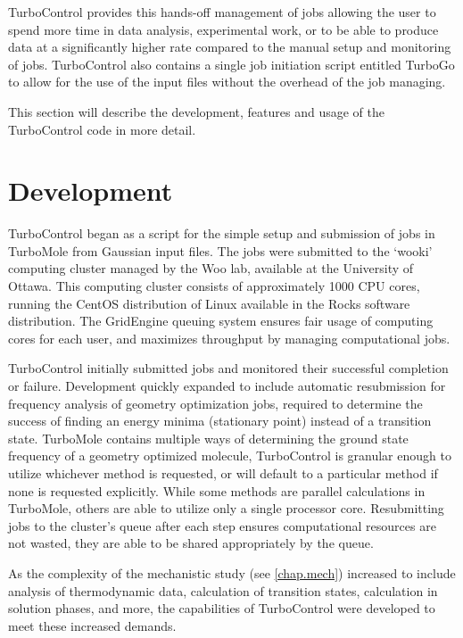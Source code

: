 TurboControl provides this hands-off management of jobs allowing the user to spend more time in data analysis, experimental work, or to be able to produce data at a significantly higher rate compared to the manual setup and monitoring of jobs. TurboControl also contains a single job initiation script entitled TurboGo to allow for the use of the input files without the overhead of the job managing.

This section will describe the development, features and usage of the TurboControl code in more detail. 

\section{Development}

TurboControl began as a script for the simple setup and submission of jobs in TurboMole from Gaussian input files. The jobs were submitted to the `wooki' computing cluster managed by the Woo lab, available at the University of Ottawa. This computing cluster consists of approximately 1000 CPU cores, running the CentOS distribution of Linux available in the Rocks software distribution. The GridEngine queuing system ensures fair usage of computing cores for each user, and maximizes throughput by managing computational jobs. 

TurboControl initially submitted jobs and monitored their successful completion or failure. Development quickly expanded to include automatic resubmission for frequency analysis of geometry optimization jobs, required to determine the success of finding an energy minima (stationary point) instead of a transition state. TurboMole contains multiple ways of determining the ground state frequency of a geometry optimized molecule, TurboControl is granular enough to utilize whichever method is requested, or will default to a particular method if none is requested explicitly. While some methods are parallel calculations in TurboMole, others are able to utilize only a single processor core. Resubmitting jobs to the cluster's queue after each step ensures computational resources are not wasted, they are able to be shared appropriately by the queue.

As the complexity of the mechanistic study (see \autoref{chap.mech}) increased to include analysis of thermodynamic data, calculation of transition states, calculation in solution phases, and more, the capabilities of TurboControl were developed to meet these increased demands. 

